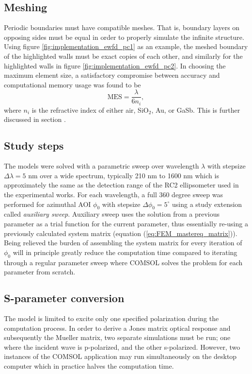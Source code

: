 \subsection{Meshing}
Periodic boundaries must have compatible meshes. That is, boundary layers on opposing sides must be equal in order to properly simulate the infinite structure. Using figure \ref{fig:implementation_ewfd_pc1} as an example, the meshed boundary of the highlighted walls must be exact copies of each other, and similarly for the highlighted walls in figure \ref{fig:implementation_ewfd_pc2}. In choosing the maximum element size, a satisfactory compromise between accuracy and computational memory usage was found to be 
\begin{equation}
    \text{MES} = \frac{\lambda}{6n_i},
    \label{eq:MES=lambda/6n}
\end{equation}
where $n_i$ is the refractive index of either air, SiO$_2$, Au, or GaSb. This is further discussed in section . 

\subsection{Study steps}
The models were solved with a parametric sweep over wavelength $\lambda$ with stepsize $\Delta\lambda=5$ nm over a wide spectrum, typically 210 nm to 1600 nm which is approximately the same as the detection range of the RC2 ellipsometer used in the experimental works. For each wavelength, a full 360 degree sweep was performed for azimuthal AOI $\phi_0$ with stepsize $\Delta\phi_0=5^{\circ}$ using a study extension called \emph{auxiliary sweep}. Auxiliary sweep uses the solution from a previous parameter as a trial function for the current parameter, thus essentially re-using a previously calculated system matrix (equation (\ref{eq:FEM_mastereq_matrix})). Being relieved the burden of assembling the system matrix for every iteration of $\phi_0$ will in principle greatly reduce the computation time compared to iterating through a regular parameter sweep where COMSOL solves the problem for each parameter from scratch. 


\subsection{S-parameter conversion}
 The model is limited to excite only one specified polarization during the computation process. In order to derive a Jones matrix optical response and subsequently the Mueller matrix, two separate simulations must be run; one where the incident wave is p-polarized, and the other s-polarized. However, two instances of the COMSOL application may run simultaneously on the desktop computer which in practice halves the computation time. 

